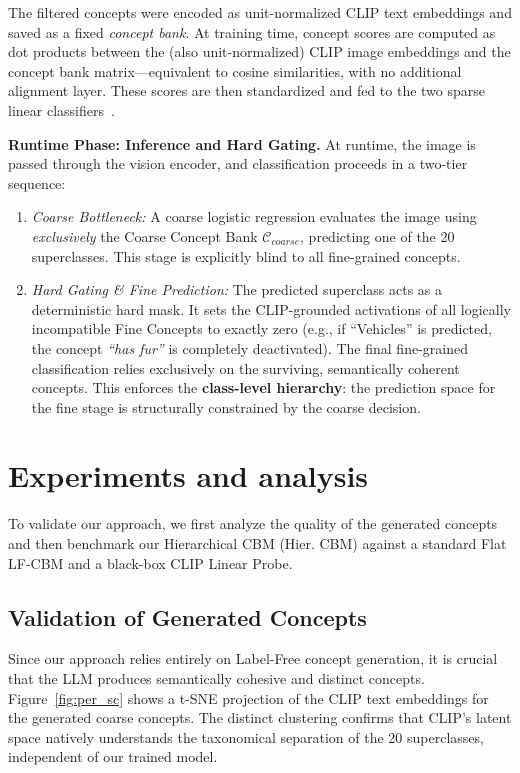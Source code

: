 \documentclass[sigconf, nonacm]{acmart}
\begin{document}
The filtered concepts were encoded as unit-normalized CLIP text embeddings and saved as a fixed \textit{concept bank}. At training time, concept scores are computed as dot products between the (also unit-normalized) CLIP image embeddings and the concept bank matrix---equivalent to cosine similarities, with no additional alignment layer. These scores are then standardized and fed to the two sparse linear classifiers~\cite{Pastor_2026_tutorial}.

\textbf{Runtime Phase: Inference and Hard Gating.} At runtime, the image is passed through the vision encoder, and classification proceeds in a two-tier sequence:
\begin{enumerate}
    \item \textit{Coarse Bottleneck:} A coarse logistic regression evaluates the image using \textit{exclusively} the Coarse Concept Bank $\mathcal{C}_{coarse}$, predicting one of the 20 superclasses. This stage is explicitly blind to all fine-grained concepts.
    \item \textit{Hard Gating \& Fine Prediction:} The predicted superclass acts as a deterministic hard mask. It sets the CLIP-grounded activations of all logically incompatible Fine Concepts to exactly zero (e.g., if ``Vehicles'' is predicted, the concept \textit{``has fur''} is completely deactivated). The final fine-grained classification relies exclusively on the surviving, semantically coherent concepts. This enforces the \textbf{class-level hierarchy}: the prediction space for the fine stage is structurally constrained by the coarse decision.
\end{enumerate}


\section{Experiments and analysis}
To validate our approach, we first analyze the quality of the generated concepts and then benchmark our Hierarchical CBM (Hier. CBM) against a standard Flat LF-CBM and a black-box CLIP Linear Probe. 

\subsection{Validation of Generated Concepts}
Since our approach relies entirely on Label-Free concept generation, it is crucial that the LLM produces semantically cohesive and distinct concepts. Figure~\ref{fig:per_sc} shows a t-SNE projection of the CLIP text embeddings for the generated coarse concepts. The distinct clustering confirms that CLIP's latent space natively understands the taxonomical separation of the 20 superclasses, independent of our trained model.
\end{document}
